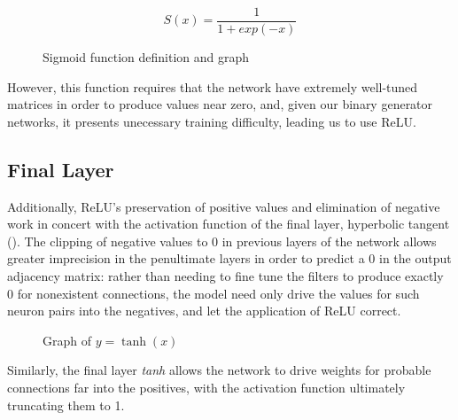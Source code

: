 \begin{figure}[h]
	\centering
	\begin{minipage}{.48\textwidth}
		\begin{equation*}
			S(x) = \frac{1}{1 + exp(-x)}
		\end{equation*}
	\end{minipage}
	\begin{minipage}{.35\textwidth}
	\end{minipage}
	\caption{Sigmoid function definition and graph}
	\label{fig:sigmoid}
\end{figure}\noindent
However, this function requires that the network have extremely well-tuned 
matrices in order to produce values near zero, and, given our binary generator 
networks, it presents unecessary training difficulty, leading us to use ReLU.


\subsection{Final Layer}
\label{subsec:finalactivation}
Additionally, ReLU's preservation of positive values and elimination of negative 
work in concert with the activation function of the final layer, hyperbolic 
tangent ().
The clipping of negative values to 0 in previous layers of the network allows 
greater imprecision in the penultimate layers in order to predict a 0 in the 
output adjacency matrix: rather than needing to fine tune the filters to produce 
exactly 0 for nonexistent connections, the model need only drive the values for 
such neuron pairs into the negatives, and let the application of ReLU correct.  

\begin{wrapfigure}[5]{r}{.45\textwidth}
	\centering
	\vspace{-14pt}
	\caption{Graph of $y=\tanh(x)$}
	\label{fig:tanh}
\end{wrapfigure}
Similarly, the final layer \textit{tanh} allows the network to drive weights for 
probable connections far into the positives, with the activation function 
ultimately truncating them to 1.

